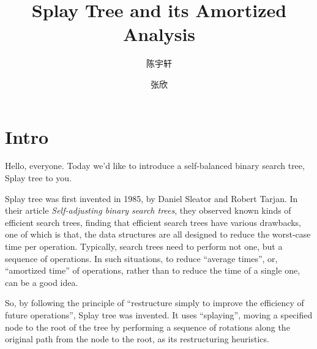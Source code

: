 \documentclass{ctexart}
\author{陈宇轩 \and 张欣}
\title{Splay Tree and its Amortized Analysis}
\begin{document}
    \maketitle

    \section{Intro}

    Hello, everyone. Today we'd like to introduce a self-balanced binary search tree, Splay tree to you.

    Splay tree was first invented in 1985, by Daniel Sleator and Robert Tarjan. In their article \textit{Self-adjusting binary search trees},
    they observed known kinds of efficient search trees, finding that efficient search trees have various drawbacks, one of which is that, the
    data structures are all designed to reduce the worst-case time per operation. Typically, search trees need to perform not one, but a
    sequence of operations. In such situations, to reduce ``average times'', or, ``amortized time'' of operations, rather than to reduce the
    time of a single one, can be a good idea.

    So, by following the principle of ``restructure simply to improve the efficiency of future operations'', Splay tree was invented. It
    uses ``splaying'', moving a specified node to the root of the tree by performing a sequence of rotations along the original path from the
    node to the root, as its restructuring heuristics.
\end{document}
